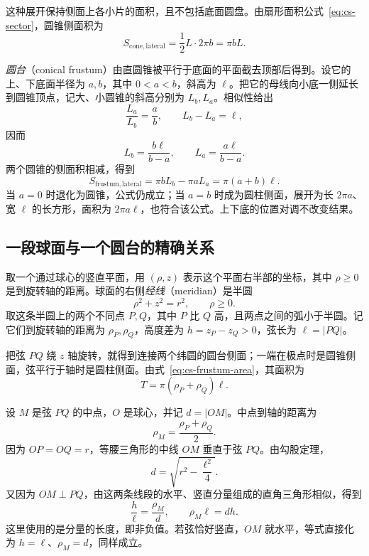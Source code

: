 \documentclass[UTF8,12pt,a4paper,fontset=fandol]{ctexart}
\begin{document}
这种展开保持侧面上各小片的面积，且不包括底面圆盘。由扇形面积公式~\eqref{eq:cs-sector}，圆锥侧面积为
\begin{equation}\label{eq:cs-cone-lateral-area}
  S_{\mathrm{cone,lateral}}=\frac12L\cdot2\pi b=\pi bL.
\end{equation}

\emph{圆台}（conical frustum）由直圆锥被平行于底面的平面截去顶部后得到。设它的上、下底面半径为 $a,b$，其中 $0<a<b$，斜高为 $\ell$。把它的母线向小底一侧延长到圆锥顶点，记大、小圆锥的斜高分别为 $L_b,L_a$。相似性给出
\[
  \frac{L_a}{L_b}=\frac ab,\qquad L_b-L_a=\ell,
\]
因而
\[
  L_b=\frac{b\ell}{b-a},\qquad L_a=\frac{a\ell}{b-a}.
\]
两个圆锥的侧面积相减，得到
\begin{equation}\label{eq:cs-frustum-area}
  S_{\mathrm{frustum,lateral}}
  =\pi bL_b-\pi aL_a
  =\boxed{\pi(a+b)\ell}.
\end{equation}
当 $a=0$ 时退化为圆锥，公式仍成立；当 $a=b$ 时成为圆柱侧面，展开为长 $2\pi a$、宽 $\ell$ 的长方形，面积为 $2\pi a\ell$，也符合该公式。上下底的位置对调不改变结果。

\subsection{一段球面与一个圆台的精确关系}
\label{subsec:cs-zone-frustum}

取一个通过球心的竖直平面，用 $(\rho,z)$ 表示这个平面右半部的坐标，其中 $\rho\geq0$ 是到旋转轴的距离。球面的右侧\emph{经线}（meridian）是半圆
\[
  \rho^2+z^2=r^2,\qquad \rho\geq0.
\]
取这条半圆上的两个不同点 $P,Q$，其中 $P$ 比 $Q$ 高，且两点之间的弧小于半圆。记它们到旋转轴的距离为 $\rho_P,\rho_Q$，高度差为 $h=z_P-z_Q>0$，弦长为 $\ell=|PQ|$。

把弦 $PQ$ 绕 $z$ 轴旋转，就得到连接两个纬圆的圆台侧面；一端在极点时是圆锥侧面，弦平行于轴时是圆柱侧面。由式~\eqref{eq:cs-frustum-area}，其面积为
\[
  T=\pi(\rho_P+\rho_Q)\ell.
\]

设 $M$ 是弦 $PQ$ 的中点，$O$ 是球心，并记 $d=|OM|$。中点到轴的距离为
\[
  \rho_M=\frac{\rho_P+\rho_Q}{2}.
\]
因为 $OP=OQ=r$，等腰三角形的中线 $OM$ 垂直于弦 $PQ$。由勾股定理，
\begin{equation}\label{eq:cs-chord-distance}
  d=\sqrt{r^2-\frac{\ell^2}{4}}.
\end{equation}
又因为 $OM\perp PQ$，由这两条线段的水平、竖直分量组成的直角三角形相似，得到
\begin{equation}\label{eq:cs-chord-height}
  \frac{h}{\ell}=\frac{\rho_M}{d},\qquad
  \rho_M\ell=dh.
\end{equation}
这里使用的是分量的长度，即非负值。若弦恰好竖直，$OM$ 就水平，等式直接化为 $h=\ell$、$\rho_M=d$，同样成立。
\end{document}
